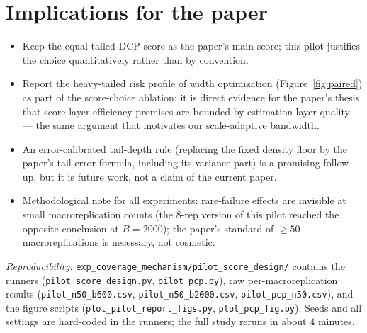 \documentclass[11pt]{article}
\begin{document}
\section{Implications for the paper}

\begin{itemize}
  \item Keep the equal-tailed DCP score as the paper's main score; this
  pilot justifies the choice quantitatively rather than by convention.
  \item Report the heavy-tailed risk profile of width optimization
  (Figure~\ref{fig:paired}) as part of the score-choice ablation: it is
  direct evidence for the paper's thesis that score-layer efficiency
  promises are bounded by estimation-layer quality --- the same argument
  that motivates our scale-adaptive bandwidth.
  \item An error-calibrated tail-depth rule (replacing the fixed density
  floor by the paper's tail-error formula, including its variance part) is a
  promising follow-up, but it is future work, not a claim of the current
  paper.
  \item Methodological note for all experiments: rare-failure effects are
  invisible at small macroreplication counts (the $8$-rep version of this
  pilot reached the opposite conclusion at $B=2000$); the paper's standard
  of $\geq 50$ macroreplications is necessary, not cosmetic.
\end{itemize}

\vspace{1em}
\noindent\small\textit{Reproducibility.}
\texttt{exp\_coverage\_mechanism/pilot\_score\_design/} contains the runners
(\texttt{pilot\_score\_design.py}, \texttt{pilot\_pcp.py}), raw
per-macroreplication results (\texttt{pilot\_n50\_b600.csv},
\texttt{pilot\_n50\_b2000.csv}, \texttt{pilot\_pcp\_n50.csv}), and the figure
scripts (\texttt{plot\_pilot\_report\_figs.py}, \texttt{plot\_pcp\_fig.py}).
Seeds and all settings are hard-coded in the runners; the full study reruns
in about $4$ minutes.
\end{document}
